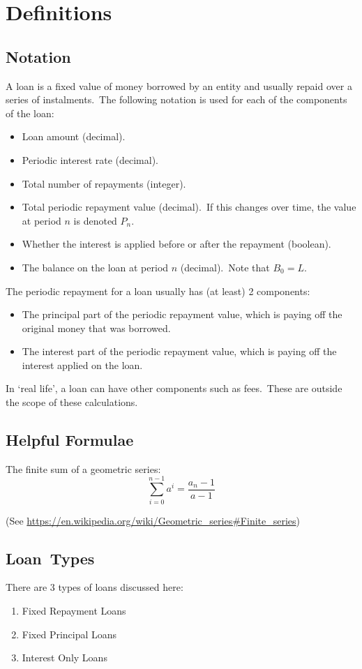 
\section{Definitions}\label{sec:definitions}


\subsection{Notation}\label{subsec:notation}

A loan is a fixed value of money borrowed by an entity and usually repaid over a series of instalments.\ The following notation is used for each of the components of the loan:
\begin{itemize}
    \item[\(L\):] Loan amount (decimal).
    \item[\(R\):] Periodic interest rate (decimal).
    \item[\(N\):] Total number of repayments (integer).
    \item[\(P\):] Total periodic repayment value (decimal).\ If this changes over time, the value at period \(n\) is denoted \(P_{n}\).
    \item[\(b\):] Whether the interest is applied before or after the repayment (boolean).
    \item[\(B_{n}\):] The balance on the loan at period \(n\) (decimal).\ Note that \(B_{0} = L\).
\end{itemize}

The periodic repayment for a loan usually has (at least) 2 components:
\begin{itemize}
    \item[\(P_{P}\):] The principal part of the periodic repayment value, which is paying off the original money that was borrowed.
    \item[\(P_{I}\):] The interest part of the periodic repayment value, which is paying off the interest applied on the loan.
\end{itemize}

In `real life', a loan can have other components such as fees.\ These are outside the scope of these calculations.


\subsection{Helpful Formulae}\label{subsec:helpful-formulae}

The finite sum of a geometric series:
\begin{equation*}
    \sum_{i = 0}^{n - 1} a^{i} = \frac{a_{n} - 1}{a - 1}
\end{equation*}

(See \url{https://en.wikipedia.org/wiki/Geometric\_series\#Finite\_series})


\subsection{Loan~Types}\label{subsec:loan-types}
There are 3 types of loans discussed here:
\begin{enumerate}
    \item Fixed Repayment Loans
    \item Fixed Principal Loans
    \item Interest Only Loans
\end{enumerate}
